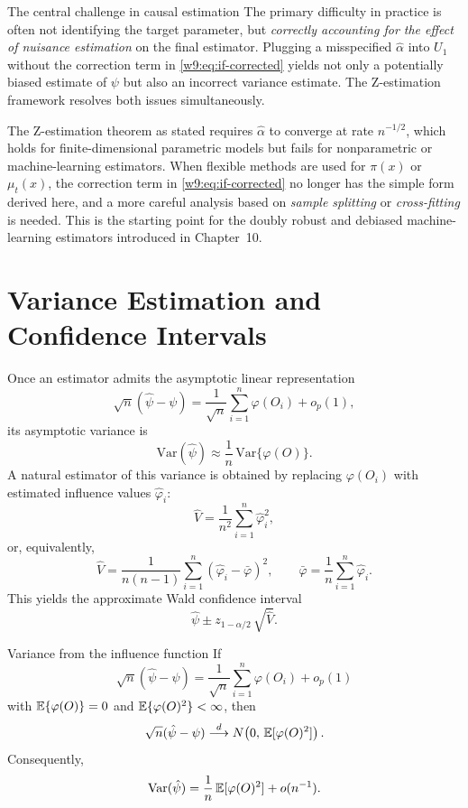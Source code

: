 \documentclass[master.tex]{subfiles}
\begin{document}
\begin{warn}{The central challenge in causal estimation}
The primary difficulty in practice is often not identifying the target
parameter, but \emph{correctly accounting for the effect of nuisance
estimation} on the final estimator.  Plugging a misspecified
$\hat\alpha$ into $U_1$ without the correction term in
\eqref{w9:eq:if-corrected} yields not only a potentially biased
estimate of $\psi$ but also an incorrect variance estimate.  The
Z-estimation framework resolves both issues simultaneously.
\end{warn}

\begin{remark}
\label{w9:rem:ml}
The Z-estimation theorem as stated requires $\hat\alpha$ to converge
at rate $n^{-1/2}$, which holds for finite-dimensional parametric
models but fails for nonparametric or machine-learning estimators.
When flexible methods are used for $\pi(x)$ or $\mu_t(x)$, the
correction term in \eqref{w9:eq:if-corrected} no longer has the simple
form derived here, and a more careful analysis based on
\emph{sample splitting} or \emph{cross-fitting} is needed.  This is
the starting point for the doubly robust and debiased machine-learning
estimators introduced in Chapter~10.
\end{remark}

\section{Variance Estimation and Confidence Intervals}
\label{w9:sec:variance}

Once an estimator admits the asymptotic linear representation
\[
  \sqrt{n}(\hat\psi - \psi)
  =
  \frac{1}{\sqrt{n}}\sum_{i=1}^n \varphi(O_i) + o_p(1),
\]
its asymptotic variance is
\[
  \mathrm{Var}(\hat\psi)
  \approx
  \frac{1}{n}\,\mathrm{Var}\{\varphi(O)\}.
\]
A natural estimator of this variance is obtained by replacing
$\varphi(O_i)$ with estimated influence values $\hat\varphi_i$:
\[
  \hat V
  =
  \frac{1}{n^2}\sum_{i=1}^n \hat\varphi_i^2,
\]
or, equivalently,
\[
  \hat V
  =
  \frac{1}{n(n-1)}\sum_{i=1}^n (\hat\varphi_i - \bar\varphi)^2,
  \qquad
  \bar\varphi = \frac{1}{n}\sum_{i=1}^n \hat\varphi_i.
\]
This yields the approximate Wald confidence interval
\[
  \hat\psi \pm z_{1-\alpha/2}\,\sqrt{\hat V}.
\]

\begin{prop}{Variance from the influence function}
\label{w9:prop:variance}
If
\[
  \sqrt{n}(\hat\psi - \psi)
  =
  \frac{1}{\sqrt{n}}\sum_{i=1}^n \varphi(O_i) + o_p(1)
\]
with $\mathbb{E}\{\varphi(O)\} = 0$ and $\mathbb{E}\{\varphi(O)^2\} < \infty$, then
\[
  \sqrt{n}(\hat\psi - \psi)
  \overset{d}{\longrightarrow}
  N\!\left(0,\, \mathbb{E}[\varphi(O)^2]\right).
\]
Consequently,
\[
  \mathrm{Var}(\hat\psi) = \frac{1}{n}\,\mathbb{E}[\varphi(O)^2] + o(n^{-1}).
\]
\end{prop}
\end{document}
